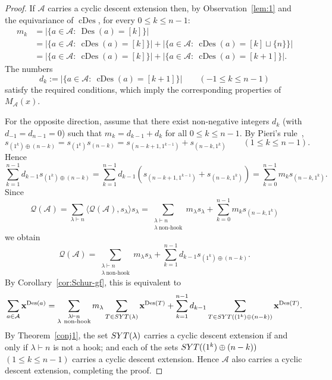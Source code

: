 \documentclass[10pt]{article}
\theoremstyle{definition}
\newcommand{\Q}{\mathcal Q}
\newcommand{\A}{\mathcal A}
\DeclareMathOperator\Des{Des}
\DeclareMathOperator\cDes{cDes}
\def\SYT{{\rm SYT}}
\newcommand{\card}[1]{\ensuremath{\left|#1\right|}}
\begin{document}
\begin{proof}
    If $\A$ carries a cyclic descent extension then, by Observation~\ref{lem:1} and the equivariance of $\cDes$, for every $0 \le k \le n-1$:
    \begin{align*}
        m_k
        &= \card{\{a\in \A:\ \Des(a)=[k]\}} \\
        &= \card{\{a\in \A:\ \cDes(a)=[k]\}}+\card{\{a\in \A:\ \cDes(a)=[k]\sqcup\{n\}\}} \\
        &= \card{\{a\in \A:\ \cDes(a)=[k]\}}+\card{\{a\in \A:\ \cDes(a)=[k+1]\}}.
    \end{align*}
    The numbers
    \[
        d_k := \card{\{a\in \A:\ \cDes(a)=[k+1]\}}
        \qquad (-1 \le k \le n-1)
    \]
    satisfy the required conditions,
    which imply the corresponding properties of $M_\A(x)$.

    For the opposite direction, assume that
    there exist non-negative integers $d_k$ (with $d_{-1} = d_{n-1} = 0$)
    such that $m_k=d_{k-1}+d_k$ for all $0\le k\le n-1$. 
    By Pieri's rule~\cite[Theorem 7.15.7]{EC2}, 
    \[
        s_{(1^k) \oplus (n-k)}=s_{(1^k)} s_{(n-k)}=s_{(n-k+1,1^{k-1})}+s_{(n-k,1^k)}
        \qquad (1 \le k \le n-1).
    \]
    Hence
    \[
        \sum_{k=1}^{n-1} d_{k-1} s_{(1^k)\oplus (n-k)} 
        = \sum_{k=1}^{n-1} d_{k-1} (s_{(n-k+1,1^{k-1})}+s_{(n-k,1^k)})
        =\sum_{k=0}^{n-1} m_k s_{(n-k,1^k)}. 
    \]
    Since
    \[
        \Q(\A) 
        = \sum_{\lambda \vdash n} \langle \Q(\A), s_\lambda \rangle s_\lambda 
        = \sum_{\substack{\lambda\vdash n \\ \lambda \ \text{non-hook}}} m_\lambda s_\lambda +
        \sum_{k=0}^{n-1} m_k s_{(n-k,1^k)}
    \]
    we obtain
    \begin{equation}\label{eq:q}
        \Q(\A) 
        = \sum_{\substack{\lambda\vdash n \\ \lambda \ \text{non-hook}}} m_\lambda s_\lambda +
        \sum_{k=1}^{n-1} d_{k-1} s_{(1^k)\oplus (n-k)}.
    \end{equation}
    By Corollary~\ref{cor:Schur-gf}, this is equivalent to
    \[
        \sum_{a\in \A} {\bf x}^{\Des(a)} = \sum_{\substack{\lambda\vdash n \\ \lambda\ \text{non-hook}}} m_\lambda 
        \sum_{T\in \SYT(\lambda)} {\bf x}^{\Des(T)} + 	\sum_{k=1}^{n-1} d_{k-1}
        \sum_{T \in \SYT((1^k)\oplus (n-k))} {\bf x}^{\Des(T)}.
    \]
    By Theorem~\ref{conj1},  
    the set $\SYT(\lambda)$ carries a cyclic descent extension if and only if $\lambda \vdash n$ is not a hook; 
    and each of the sets $\SYT((1^k)\oplus (n-k))$ $(1 \le k \le n-1)$ carries a cyclic descent extension. 
    Hence $\A$ also carries a cyclic descent extension, completing the proof. 
\end{proof}
\end{document}
